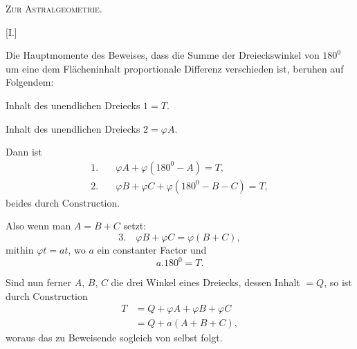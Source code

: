 \clearpage
{}%
\begin{center}\Large\textsc{Zur Astralgeometrie.}\end{center}
\bigskip
\begin{center}[I.]\end{center}
Die Hauptmomente des Beweises, dass die Summe der Dreieckswinkel von $180^{0}$ um eine dem Flächeninhalt proportionale Differenz verschieden ist, beruhen auf Folgendem:
\begin{center}\hspace{1em}\end{center}
Inhalt des unendlichen Dreiecks $1=T$.

Inhalt des unendlichen Dreiecks $2=\varphi A$.

Dann ist
\[
\begin{aligned}
1.\quad &\varphi A+\varphi(180^{0}-A)=T,\\
2.\quad &\varphi B+\varphi C+\varphi(180^{0}-B-C)=T,
\end{aligned}
\]
beides durch Construction.

Also wenn man $A=B+C$ setzt:
\[
3.\quad\varphi B+\varphi C=\varphi(B+C),
\]
mithin $\varphi t=at$, wo $a$ ein constanter Factor und
\[
a.180^{0}=T.
\]
\begin{center}\end{center}
Sind nun ferner $A$, $B$, $C$ die drei Winkel eines Dreiecks, dessen Inhalt $=Q$, so ist durch Construction
\[
\begin{aligned}
T&=Q+\varphi A+\varphi B+\varphi C\\
&=Q+a(A+B+C),
\end{aligned}
\]
woraus das zu Beweisende sogleich von selbst folgt.

